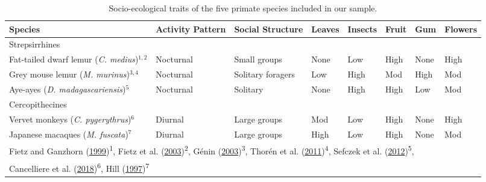 \documentclass[twoside,12pt,final]{ucthesis-CA2012}
\begin{document}
\begin{ucmainmatter}



\begin{table}

\caption{\label{tab:Socio-ecology-Table}Socio-ecological traits of the five primate species included in our sample.}
\centering
\fontsize{8}{10}\selectfont
\begin{tabular}[t]{l|>{\raggedright\arraybackslash}p{1.4cm}|l|l|l|l|l|>{\raggedright\arraybackslash}p{1cm}}
\hline
Species & Activity Pattern & Social Structure & Leaves & Insects & Fruit & Gum & Flowers\\
\hline
Strepsirrhines &  &  &  &  &  &  & \\
\hline
Fat-tailed dwarf lemur (\textit{C. medius})$^{1,2}$ & Nocturnal & Small groups & None & Low & High & None & High\\
\hline
Grey mouse lemur (\textit{M. murinus})$^{3,4}$ & Nocturnal & Solitary foragers & Low & High & Mod & High & Mod\\
\hline
Aye-ayes (\textit{D. madagascariensis})$^5$ & Nocturnal & Solitary & None & High & High & Low & Mod\\
\hline
Cercopithecines &  &  &  &  &  &  & \\
\hline
Vervet monkeys (\textit{C. pygerythrus})$^6$ & Diurnal & Large groups & Mod & Low & High & None & High\\
\hline
Japanese macaques (\textit{M. fuscata})$^7$ & Diurnal & Large groups & High & Low & High & None & Mod\\
\hline
\multicolumn{8}{l}{\textsuperscript{} Fietz and Ganzhorn (\protect\hyperlink{ref-fietz1999}{1999})\textsuperscript{1}, Fietz et al. (\protect\hyperlink{ref-fietz2003}{2003})\textsuperscript{2}, Génin (\protect\hyperlink{ref-genin2003}{2003})\textsuperscript{3}, Thorén et al. (\protect\hyperlink{ref-thoren2011}{2011})\textsuperscript{4}, Sefczek et al. (\protect\hyperlink{ref-sefczek2012}{2012})\textsuperscript{5},}\\
\multicolumn{8}{l}{\textsuperscript{} Cancelliere et al. (\protect\hyperlink{ref-cancelliere2018}{2018})\textsuperscript{6}, Hill (\protect\hyperlink{ref-hill1997}{1997})\textsuperscript{7}}\\
\end{tabular}
\end{table}

\end{ucmainmatter}
\end{document}
